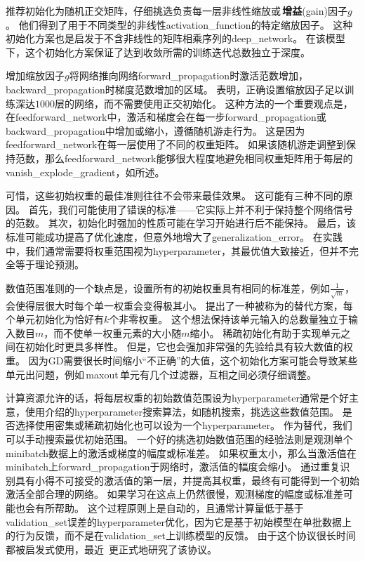 \cite{Saxe-et-al-ICLR13}推荐初始化为随机正交矩阵，仔细挑选负责每一层非线性缩放或\,\textbf{增益}(gain)因子$g$。
他们得到了用于不同类型的非线性\gls{activation_function}的特定缩放因子。
这种初始化方案也是启发于不含非线性的矩阵相乘序列的\gls{deep_network}。
在该模型下，这个初始化方案保证了达到收敛所需的训练迭代总数独立于深度。


增加缩放因子$g$将网络推向网络\gls{forward_propagation}时激活范数增加，\gls{backward_propagation}时梯度范数增加的区域。
\cite{Sussillo14}表明，正确设置缩放因子足以训练深达$1000$层的网络，而不需要使用正交初始化。
这种方法的一个重要观点是，在\gls{feedforward_network}中，激活和梯度会在每一步\gls{forward_propagation}或\gls{backward_propagation}中增加或缩小，遵循随机游走行为。
这是因为\gls{feedforward_network}在每一层使用了不同的权重矩阵。
如果该随机游走调整到保持范数，那么\gls{feedforward_network}能够很大程度地避免相同权重矩阵用于每层的\gls{vanish_explode_gradient}，如所述。


可惜，这些初始权重的最佳准则往往不会带来最佳效果。
这可能有三种不同的原因。
首先，我们可能使用了错误的标准——它实际上并不利于保持整个网络信号的范数。
其次，初始化时强加的性质可能在学习开始进行后不能保持。
最后，该标准可能成功提高了优化速度，但意外地增大了\gls{generalization_error}。
在实践中，我们通常需要将权重范围视为\gls{hyperparameter}，其最优值大致接近，但并不完全等于理论预测。


数值范围准则的一个缺点是，设置所有的初始权重具有相同的标准差，例如$\frac{1}{\sqrt{m}}$，会使得层很大时每个单一权重会变得极其小。
\cite{martens2010hessian-small}提出了一种被称为的替代方案，每个单元初始化为恰好有$k$个非零权重。
这个想法保持该单元输入的总数量独立于输入数目$m$，而不使单一权重元素的大小随$m$缩小。
稀疏初始化有助于实现单元之间在初始化时更具多样性。
但是，它也会强加非常强的先验给具有较大数值的权重。
因为\gls{GD}需要很长时间缩小``不正确''的大值，这个初始化方案可能会导致某些单元出问题，例如\,\gls{maxout}\,单元有几个过滤器，互相之间必须仔细调整。


计算资源允许的话，将每层权重的初始数值范围设为\gls{hyperparameter}通常是个好主意，使用介绍的\gls{hyperparameter}搜索算法，如随机搜索，挑选这些数值范围。
是否选择使用密集或稀疏初始化也可以设为一个\gls{hyperparameter}。
作为替代，我们可以手动搜索最优初始范围。
一个好的挑选初始数值范围的经验法则是观测单个\gls{minibatch}数据上的激活或梯度的幅度或标准差。
如果权重太小，那么当激活值在\gls{minibatch}上\gls{forward_propagation}于网络时，激活值的幅度会缩小。
通过重复识别具有小得不可接受的激活值的第一层，并提高其权重，最终有可能得到一个初始激活全部合理的网络。
如果学习在这点上仍然很慢，观测梯度的幅度或标准差可能也会有所帮助。
这个过程原则上是自动的，且通常计算量低于基于\gls{validation_set}误差的\gls{hyperparameter}优化，因为它是基于初始模型在单批数据上的行为反馈，而不是在\gls{validation_set}上训练模型的反馈。
由于这个协议很长时间都被启发式使用，最近~\cite{mishkin2015all}更正式地研究了该协议。


